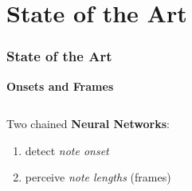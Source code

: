 \documentclass{beamer}
\newcommand{\emp}[1]{\textcolor{tum}{\textbf{#1}}}
\begin{document}
\section{State of the Art}
\begin{frame}[allowframebreaks]
	\frametitle{State of the Art}

	\emp{Onsets and Frames} %



	\begin{columns}
		\begin{column}{0.4\textwidth}
			Two chained \textbf{Neural Networks}:
			\begin{enumerate}
				\item detect \textit{note onset}
				\item perceive \textit{note lengths} (frames)
			\end{enumerate}
		\end{column}


\end{columns}
\end{frame}
\end{document}
